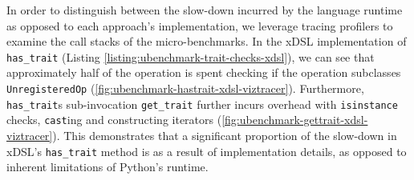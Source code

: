 In order to distinguish between the slow-down incurred by the language runtime as opposed to each approach's implementation, we leverage tracing profilers to examine the call stacks of the micro-benchmarks. In the xDSL implementation of \texttt{has_trait} (Listing \ref{listing:ubenchmark-trait-checks-xdsl}), we can see that approximately half of the operation is spent checking if the operation subclasses \texttt{UnregisteredOp} (\autoref{fig:ubenchmark-hastrait-xdsl-viztracer}).
Furthermore, \texttt{has_trait}s sub-invocation \texttt{get_trait} further incurs overhead with \texttt{isinstance} checks, \texttt{cast}ing and constructing iterators (\autoref{fig:ubenchmark-gettrait-xdsl-viztracer}).
This demonstrates that a significant proportion of the slow-down in xDSL's \texttt{has_trait} method is as a result of implementation details, as opposed to inherent limitations of Python's runtime.

